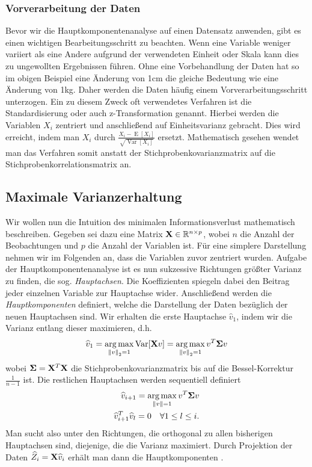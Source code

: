 \subsubsection{Vorverarbeitung der Daten}

Bevor wir die Hauptkomponentenanalyse auf einen Datensatz anwenden, gibt es einen wichtigen Bearbeitungsschritt zu beachten. Wenn eine Variable weniger variiert als eine Andere aufgrund der verwendeten Einheit oder Skala kann dies zu ungewollten Ergebnissen führen. Ohne eine Vorbehandlung der Daten hat so im obigen Beispiel eine Änderung von 1cm die gleiche Bedeutung wie eine Änderung von 1kg.  Daher werden die Daten häufig einem Vorverarbeitungsschritt unterzogen. Ein zu diesem Zweck oft verwendetes Verfahren ist die Standardisierung oder auch z-Transformation genannt. Hierbei werden die Variablen $X_i$ zentriert und anschließend auf Einheitsvarianz gebracht. Dies wird erreicht, indem man $X_i$ durch $\frac{X_i - \operatorname{E}[X_i]}{\sqrt{\operatorname{Var}[X_i]}}$ ersetzt. Mathematisch gesehen wendet man das Verfahren somit anstatt der Stichprobenkovarianzmatrix auf die Stichprobenkorrelationsmatrix an.

\subsection{Maximale Varianzerhaltung}

Wir wollen nun die Intuition des minimalen Informationsverlust mathematisch beschreiben. Gegeben sei dazu eine Matrix $\mathbf{X} \in \mathbb{R}^{n\times p}$, wobei $n$ die Anzahl der Beobachtungen und $p$ die Anzahl der Variablen ist. Für eine simplere Darstellung nehmen wir im Folgenden an, dass die Variablen zuvor zentriert wurden. Aufgabe der Hauptkomponentenanalyse ist es nun sukzessive Richtungen größter Varianz zu finden, die sog. \textit{Hauptachsen}. Die Koeffizienten spiegeln dabei den Beitrag jeder einzelnen Variable zur Hauptachse wider. Anschließend werden die \textit{Hauptkomponenten} definiert, welche die Darstellung der Daten bezüglich der neuen Hauptachsen sind. Wir erhalten die erste Hauptachse $\widehat{v}_1$, indem wir die Varianz entlang dieser maximieren, d.h.
\begin{align}
\label{pca_variance_maximization_first}
\widehat{v}_1 = \operatorname*{arg\,max}_{\left\lVert v \right\rVert_2 = 1} \operatorname{Var}[\mathbf{X}v] = \operatorname*{arg\,max}_{\left\lVert v \right\rVert_2 = 1} v^T \mathbf{\Sigma} v
\end{align}
wobei $\mathbf{\Sigma} = \mathbf{X}^T\mathbf{X}$ die Stichprobenkovarianzmatrix bis auf die Bessel-Korrektur $\frac{1}{n-1}$ ist. Die restlichen Hauptachsen werden sequentiell definiert
\begin{align}
\label{pca_variance_maximization_rest}
\begin{split}
\widehat{v}_{i+1} = \operatorname*{arg\,max}_{\left\lVert v \right\rVert = 1} v^T \mathbf{\Sigma} v\\
\widehat{v}_{i+1}^T\widehat{v}_l = 0 \quad \forall 1 \leq l \leq i.
\end{split}
\end{align}
Man sucht also unter den Richtungen, die orthogonal zu allen bisherigen Hauptachsen sind, diejenige, die die Varianz maximiert. Durch Projektion der Daten $\widehat{Z}_i = \mathbf{X}\widehat{v}_i$ erhält man dann die Hauptkomponenten \cite{vidal}.

